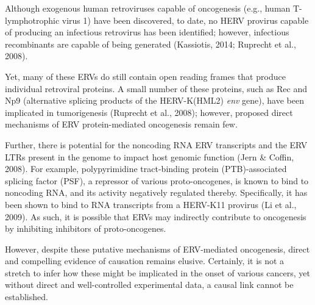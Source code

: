 \documentclass[11pt,letterpaper,final] {article}
\begin{document}
Although exogenous human retroviruses capable of oncogenesis (e.g., human T-lymphotrophic virus 1) have been discovered, to date, no HERV provirus capable of producing an infectious retrovirus has been identified; however, infectious recombinants are capable of being generated (Kassiotis, 2014; Ruprecht et al., 2008).

Yet, many of these ERVs do still contain open reading frames that produce individual retroviral proteins. A small number of these proteins, such as Rec and Np9 (alternative splicing products of the HERV-K(HML2) \textit{env} gene), have been implicated in tumorigenesis (Ruprecht et al., 2008); however, proposed direct mechanisms of ERV protein-mediated oncogenesis remain few.

Further, there is potential for the noncoding RNA ERV transcripts and the ERV LTRs present in the genome to impact host genomic function (Jern \& Coffin, 2008). For example, polypyrimidine tract-binding protein (PTB)-associated splicing factor (PSF), a repressor of various proto-oncogenes, is known to bind to noncoding RNA, and its activity negatively regulated thereby. Specifically, it has been shown to bind to RNA transcripts from a HERV-K11 provirus (Li et al., 2009). As such, it is possible that ERVs may indirectly contribute to oncogenesis by inhibiting inhibitors of proto-oncogenes.

However, despite these putative mechanisms of ERV-mediated oncogenesis, direct and compelling evidence of causation remains elusive. Certainly, it is not a stretch to infer how these might be implicated in the onset of various cancers, yet without direct and well-controlled experimental data, a causal link cannot be established.


\clearpage


\end{document}
